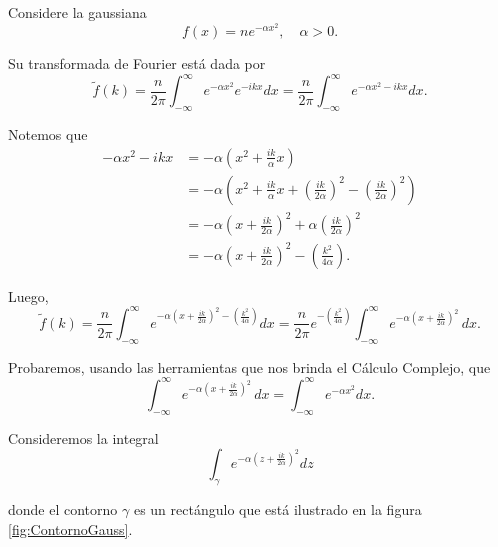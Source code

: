 \begin{ejemplo}

Considere la gaussiana
$$f(x) = n e^{-\alpha x^2}, \quad  \alpha > 0.$$

Su transformada de Fourier está dada por 
\begin{equation*}
    \tilde{f}(k) =  \frac{n}{2\pi} \int_{-\infty}^{\infty} e^{-\alpha x^2} e^{-ikx} dx =  \frac{n}{2\pi} \int_{-\infty}^{\infty} e^{-\alpha x^2-ikx} dx .
\end{equation*}

Notemos que 
\begin{align*}
    -\alpha x^2-ikx &= - \alpha \left( x^2 + \frac{ik}{\alpha}x \right) \\
    &= - \alpha \left( x^2 + \frac{ik}{\alpha} x + \left( \frac{ik}{2\alpha} \right)^2 - \left( \frac{ik}{2\alpha} \right)^2 \right) \\
    &= - \alpha \left( x + \frac{ik}{2\alpha} \right)^2 + \alpha \left( \frac{ik}{2\alpha} \right)^2 \\
    &= - \alpha \left( x + \frac{ik}{2\alpha} \right)^2 - \left( \frac{k^2}{4\alpha} \right).
\end{align*}

Luego, 
\begin{equation*}
    \tilde{f}(k) =  \frac{n}{2\pi} \int_{-\infty}^{\infty} e^{-\alpha \left( x + \frac{ik}{2\alpha} \right)^2 - \left( \frac{k^2}{4\alpha} \right)}  dx = \frac{n}{2\pi} e^{- \left( \frac{k^2}{4\alpha} \right)} \int_{-\infty}^{\infty} e^{-\alpha \left( x + \frac{ik}{2\alpha} \right)^2} \,dx. 
\end{equation*}

Probaremos, usando las herramientas que nos brinda el Cálculo Complejo, que
$$
 \int_{-\infty}^{\infty} e^{-\alpha \left( x + \frac{ik}{2\alpha} \right)^2} \,dx =  \int_{-\infty}^{\infty} e^{- \alpha x^2} dx.
$$

Consideremos la integral 
\begin{equation}
   \int_{\gamma} e^{-\alpha \left( z + \frac{ik}{2\alpha} \right)^2} dz \label{IntegralComplexGauss} 
\end{equation}

donde el contorno $\gamma$ es un rectángulo que está ilustrado en la figura \ref{fig:ContornoGauss}.


\end{ejemplo}

